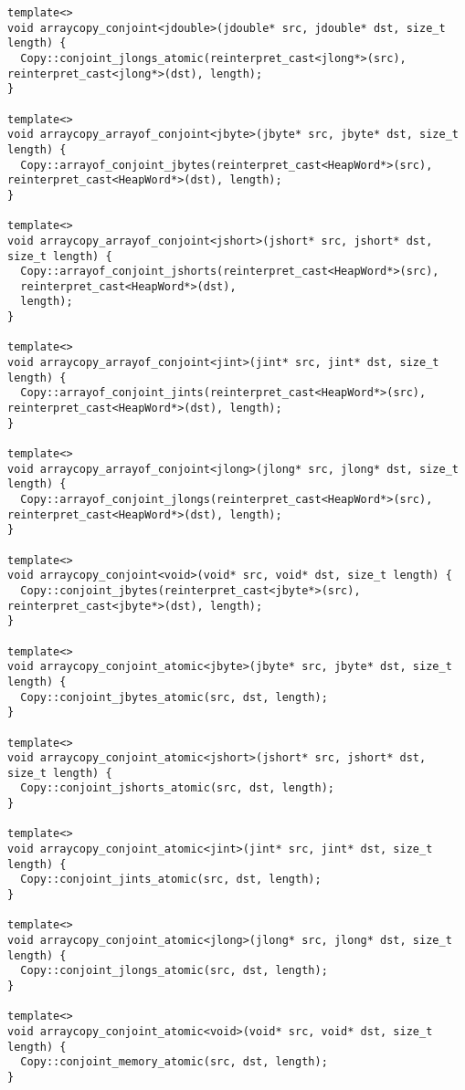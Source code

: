\begin{itemize}
\begin{verbatim}
template<>
void arraycopy_conjoint<jdouble>(jdouble* src, jdouble* dst, size_t length) {
  Copy::conjoint_jlongs_atomic(reinterpret_cast<jlong*>(src), reinterpret_cast<jlong*>(dst), length);
}
  
template<>
void arraycopy_arrayof_conjoint<jbyte>(jbyte* src, jbyte* dst, size_t length) {
  Copy::arrayof_conjoint_jbytes(reinterpret_cast<HeapWord*>(src), reinterpret_cast<HeapWord*>(dst), length);
}

template<>
void arraycopy_arrayof_conjoint<jshort>(jshort* src, jshort* dst, size_t length) {
  Copy::arrayof_conjoint_jshorts(reinterpret_cast<HeapWord*>(src),
  reinterpret_cast<HeapWord*>(dst),
  length);
}

template<>
void arraycopy_arrayof_conjoint<jint>(jint* src, jint* dst, size_t length) {
  Copy::arrayof_conjoint_jints(reinterpret_cast<HeapWord*>(src), reinterpret_cast<HeapWord*>(dst), length);
}

template<>
void arraycopy_arrayof_conjoint<jlong>(jlong* src, jlong* dst, size_t length) {
  Copy::arrayof_conjoint_jlongs(reinterpret_cast<HeapWord*>(src), reinterpret_cast<HeapWord*>(dst), length);
}

template<>
void arraycopy_conjoint<void>(void* src, void* dst, size_t length) {
  Copy::conjoint_jbytes(reinterpret_cast<jbyte*>(src), reinterpret_cast<jbyte*>(dst), length);
}

template<>
void arraycopy_conjoint_atomic<jbyte>(jbyte* src, jbyte* dst, size_t length) {
  Copy::conjoint_jbytes_atomic(src, dst, length);
}

template<>
void arraycopy_conjoint_atomic<jshort>(jshort* src, jshort* dst, size_t length) {
  Copy::conjoint_jshorts_atomic(src, dst, length);
}

template<>
void arraycopy_conjoint_atomic<jint>(jint* src, jint* dst, size_t length) {
  Copy::conjoint_jints_atomic(src, dst, length);
}

template<>
void arraycopy_conjoint_atomic<jlong>(jlong* src, jlong* dst, size_t length) {
  Copy::conjoint_jlongs_atomic(src, dst, length);
}

template<>
void arraycopy_conjoint_atomic<void>(void* src, void* dst, size_t length) {
  Copy::conjoint_memory_atomic(src, dst, length);
}
\end{verbatim}


\end{itemize}
